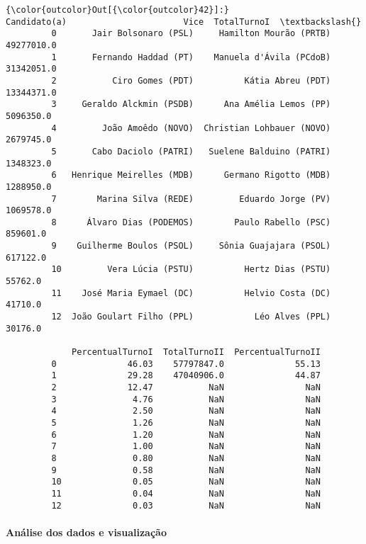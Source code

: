 \documentclass[11pt]{article}
\begin{document}
\begin{Verbatim}[commandchars=\\\{\}]
{\color{outcolor}Out[{\color{outcolor}42}]:}                 Candidato(a)                       Vice  TotalTurnoI  \textbackslash{}
         0       Jair Bolsonaro (PSL)     Hamilton Mourão (PRTB)   49277010.0   
         1       Fernando Haddad (PT)    Manuela d'Ávila (PCdoB)   31342051.0   
         2           Ciro Gomes (PDT)          Kátia Abreu (PDT)   13344371.0   
         3     Geraldo Alckmin (PSDB)      Ana Amélia Lemos (PP)    5096350.0   
         4         João Amoêdo (NOVO)  Christian Lohbauer (NOVO)    2679745.0   
         5       Cabo Daciolo (PATRI)   Suelene Balduino (PATRI)    1348323.0   
         6   Henrique Meirelles (MDB)      Germano Rigotto (MDB)    1288950.0   
         7        Marina Silva (REDE)         Eduardo Jorge (PV)    1069578.0   
         8      Álvaro Dias (PODEMOS)        Paulo Rabello (PSC)     859601.0   
         9    Guilherme Boulos (PSOL)     Sônia Guajajara (PSOL)     617122.0   
         10         Vera Lúcia (PSTU)          Hertz Dias (PSTU)      55762.0   
         11    José Maria Eymael (DC)          Helvio Costa (DC)      41710.0   
         12  João Goulart Filho (PPL)            Léo Alves (PPL)      30176.0   
         
             PercentualTurnoI  TotalTurnoII  PercentualTurnoII  
         0              46.03    57797847.0              55.13  
         1              29.28    47040906.0              44.87  
         2              12.47           NaN                NaN  
         3               4.76           NaN                NaN  
         4               2.50           NaN                NaN  
         5               1.26           NaN                NaN  
         6               1.20           NaN                NaN  
         7               1.00           NaN                NaN  
         8               0.80           NaN                NaN  
         9               0.58           NaN                NaN  
         10              0.05           NaN                NaN  
         11              0.04           NaN                NaN  
         12              0.03           NaN                NaN  
\end{Verbatim}
            
    \paragraph{Análise dos dados e
visualização}\label{anuxe1lise-dos-dados-e-visualizauxe7uxe3o}
\end{document}
